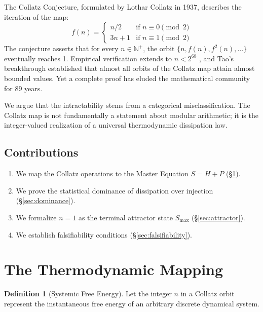 \documentclass[12pt, a4paper]{article}
\theoremstyle{plain}
\theoremstyle{definition}
\newtheorem{definition}[theorem]{Definition}
\theoremstyle{remark}
\begin{document}
The Collatz Conjecture, formulated by Lothar Collatz in 1937, describes the iteration of the map:
\begin{equation}\label{eq:collatz}
    f(n) = \begin{cases}
      n / 2 & \text{if } n \equiv 0 \pmod{2} \\
      3n + 1 & \text{if } n \equiv 1 \pmod{2}
   \end{cases}
\end{equation}
The conjecture asserts that for every $n \in \mathbb{N}^+$, the orbit $\{n, f(n), f^2(n), \ldots\}$ eventually reaches 1. Empirical verification extends to $n < 2^{68}$ \citep{Oliveira2010}, and Tao's breakthrough \citeyearpar{Tao2019} established that almost all orbits of the Collatz map attain almost bounded values. Yet a complete proof has eluded the mathematical community for 89 years.

We argue that the intractability stems from a categorical misclassification. The Collatz map is not fundamentally a statement about modular arithmetic; it is the integer-valued realization of a universal thermodynamic dissipation law.

\subsection{Contributions}
\begin{enumerate}
    \item We map the Collatz operations to the Master Equation $S = H + P$ (\S\ref{sec:mapping}).
    \item We prove the statistical dominance of dissipation over injection (\S\ref{sec:dominance}).
    \item We formalize $n=1$ as the terminal attractor state $S_{\max}$ (\S\ref{sec:attractor}).
    \item We establish falsifiability conditions (\S\ref{sec:falsifiability}).
\end{enumerate}

\section{The Thermodynamic Mapping}\label{sec:mapping}

\begin{definition}[Systemic Free Energy]
Let the integer $n$ in a Collatz orbit represent the instantaneous free energy of an arbitrary discrete dynamical system.
\end{definition}
\end{document}
